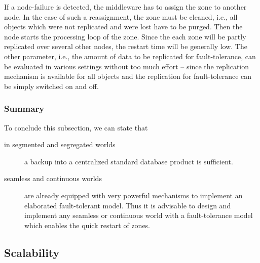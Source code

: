 \documentclass[a4paper, 10pt]{book}
\begin{document}
            If a node-failure is detected, the middleware has to assign the zone
            to another node. In the case of such a reassignment, the zone must be
            cleaned, i.e., all objects which were not replicated and were lost
            have to be purged. Then the node starts the processing loop of the
            zone. Since the each zone will be partly replicated over several other
            nodes, the restart time will be generally low. 
            The other parameter, i.e., the amount of data to be replicated for
            fault-tolerance, can be evaluated in various settings without too much
            effort -- since the replication mechanism is available for all objects
            and the replication for fault-tolerance can be simply switched on and
            off.


            \subsubsection{Summary}

            To conclude this subsection, we can state that
            \begin{description}
                \item[in segmented and segregated worlds] a backup into a centralized
                    standard database product is sufficient.
                \item[seamless and continuous worlds] are already equipped with 
                    very powerful mechanisms to implement an elaborated fault-tolerant
                    model. Thus it is advisable to design and implement any seamless or
                    continuous world with a fault-tolerance model which enables the
                    quick restart of zones.
            \end{description}



            \subsection{Scalability}
            \label{sec:scalability-1}

\end{document}
